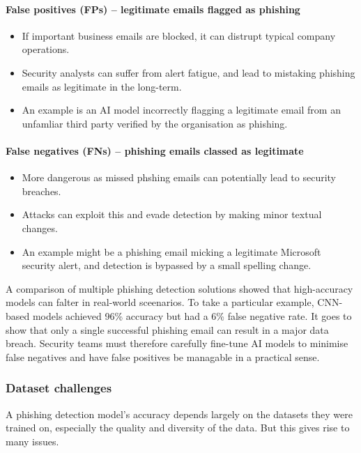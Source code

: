 \paragraph{False positives (FPs) -- legitimate emails flagged as phishing}
\begin{itemize}
    \item If important business emails are blocked, it can distrupt typical company operations.
    \item Security analysts can suffer from alert fatigue, and lead to mistaking phishing emails as legitimate in the long-term.
    \item An example is an AI model incorrectly flagging a legitimate email from an unfamliar third party verified by the organisation as phishing.
\end{itemize}

\paragraph{False negatives (FNs) -- phishing emails classed as legitimate}
\begin{itemize}
    \item More dangerous as missed phshing emails can potentially lead to security breaches.
    \item Attacks can exploit this and evade detection by making minor textual changes.
    \item An example might be a phishing email micking a legitimate Microsoft security alert, and detection is bypassed by a small spelling change.
\end{itemize}

\noindent A comparison of multiple phishing detection solutions showed that high-accuracy models can falter in real-world sceenarios. To take a particular example, CNN-based models achieved 96\% accuracy but had a 6\% false negative rate. It goes to show that only a single successful phishing email can result in a major data breach. Security teams must therefore carefully fine-tune AI models to minimise false negatives and have false positives be managable in a practical sense.

\subsubsection*{Dataset challenges}
A phishing detection model's accuracy depends largely on the datasets they were trained on, especially the quality and diversity of the data. But this gives rise to many issues.

